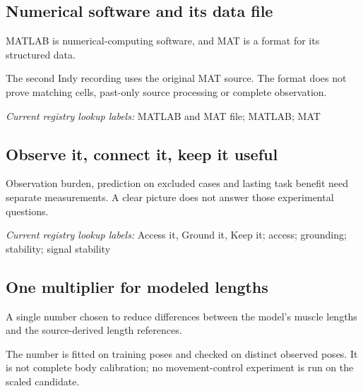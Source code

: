 \begin{samepage}
\subsection*{Numerical software and its data file}
\noindent MATLAB is numerical-computing software, and MAT is a format for its structured data.\par
\end{samepage}
\begin{samepage}
\noindent The second Indy recording uses the original MAT source. The format does not prove matching cells, past-only source processing or complete observation.\par\nopagebreak[4]

\end{samepage}


\noindent\textit{Current registry lookup labels:} MATLAB and MAT file; MATLAB; MAT\par

\begin{samepage}
\begin{samepage}
\subsection*{Observe it, connect it, keep it useful}
\noindent Observation burden, prediction on excluded cases and lasting task benefit need separate measurements. A clear picture does not answer those experimental questions.\par\nopagebreak[4]

\end{samepage}
\end{samepage}


\noindent\textit{Current registry lookup labels:} Access it, Ground it, Keep it; access; grounding; stability; signal stability\par

\begin{samepage}
\subsection*{One multiplier for modeled lengths}
\noindent A single number chosen to reduce differences between the model’s muscle lengths and the source-derived length references.\par
\end{samepage}
\begin{samepage}
\noindent The number is fitted on training poses and checked on distinct observed poses. It is not complete body calibration; no movement-control experiment is run on the scaled candidate.\par\nopagebreak[4]

\end{samepage}


